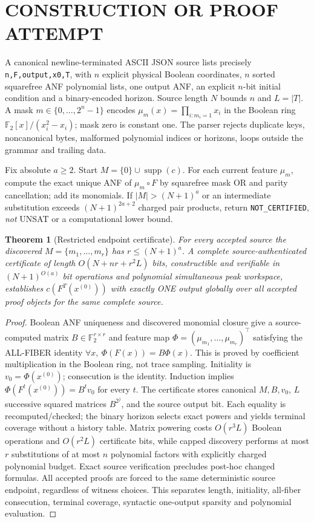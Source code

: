 \documentclass[11pt]{article}
\newtheorem{theorem}{Theorem}
\begin{document}
\section{CONSTRUCTION OR PROOF ATTEMPT}
A canonical newline-terminated ASCII JSON source lists precisely \texttt{n,F,output,x0,T}, with $n$ explicit physical Boolean coordinates, $n$ sorted squarefree ANF polynomial lists, one output ANF, an explicit $n$-bit initial condition and a binary-encoded horizon. Source length $N$ bounds $n$ and $L=|T|$. A mask $m\in\{0,\ldots,2^n-1\}$ encodes $\mu_m(x)=\prod_{i:m_i=1}x_i$ in the Boolean ring $\mathbb F_2[x]/(x_i^2-x_i)$; mask zero is constant one. The parser rejects duplicate keys, noncanonical bytes, malformed polynomial indices or horizons, loops outside the grammar and trailing data.

Fix absolute $a\ge2$. Start $M=\{0\}\cup\operatorname{supp}(c)$. For each current feature $\mu_m$, compute the exact unique ANF of $\mu_m\circ F$ by squarefree mask OR and parity cancellation; add its monomials. If $|M|>(N+1)^a$ or an intermediate substitution exceeds $(N+1)^{2a+2}$ charged pair products, return \texttt{NOT\_CERTIFIED}, \emph{not} UNSAT or a computational lower bound.

\begin{theorem}[Restricted endpoint certificate]\label{th:pos}
For every accepted source the discovered $M=\{m_1,\ldots,m_r\}$ has $r\le(N+1)^a$. A complete source-authenticated certificate of length $O(N+nr+r^2L)$ bits, constructible and verifiable in $(N+1)^{O(a)}$ bit operations and polynomial simultaneous peak workspace, establishes $c(F^T(x^{(0)}))$ with exactly ONE output globally over all accepted proof objects for the same complete source.
\end{theorem}
\begin{proof}
Boolean ANF uniqueness and discovered monomial closure give a source-computed matrix $B\in\mathbb F_2^{r\times r}$ and feature map $\Phi=(\mu_{m_1},\ldots,\mu_{m_r})^\top$ satisfying the ALL-FIBER identity $\forall x,\ \Phi(F(x))=B\Phi(x)$. This is proved by coefficient multiplication in the Boolean ring, not trace sampling. Initiality is $v_0=\Phi(x^{(0)})$; consecution is the identity. Induction implies $\Phi(F^t(x^{(0)}))=B^tv_0$ for every $t$. The certificate stores canonical $M,B,v_0$, $L$ successive squared matrices $B^{2^j}$, and the source output bit. Each equality is recomputed/checked; the binary horizon selects exact powers and yields terminal coverage without a history table. Matrix powering costs $O(r^3L)$ Boolean operations and $O(r^2L)$ certificate bits, while capped discovery performs at most $r$ substitutions of at most $n$ polynomial factors with explicitly charged polynomial budget. Exact source verification precludes post-hoc changed formulas. All accepted proofs are forced to the same deterministic source endpoint, regardless of witness choices. This separates length, initiality, all-fiber consecution, terminal coverage, syntactic one-output sparsity and polynomial evaluation.
\end{proof}
\end{document}

